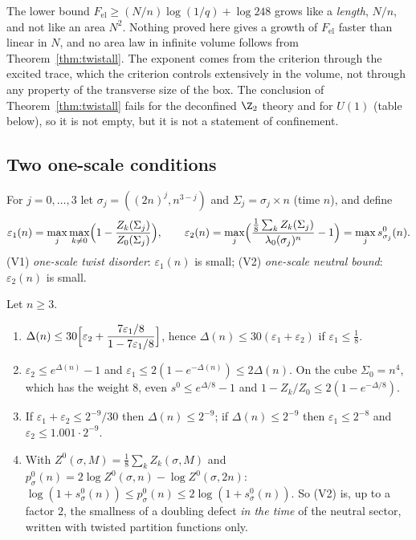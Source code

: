 \begin{remark}\label{rem:length}
The lower bound $F_{\mathrm{el}}\ge(N/n)\log(1/q)+\log248$ grows like a \emph{length}, $N/n$, and not like an area $N^2$. Nothing proved here gives a growth of $F_{\mathrm{el}}$ faster than linear in $N$, and no area law in infinite volume follows from Theorem~\ref{thm:twistall}. The exponent comes from the criterion through the excited trace, which the criterion controls extensively in the volume, not through any property of the transverse size of the box. The conclusion of Theorem~\ref{thm:twistall} fails for the deconfined $\Z_2$ theory and for $U(1)$ (table below), so it is not empty, but it is not a statement of confinement.
\end{remark}

\subsection{Two one-scale conditions}\label{subsec:T3}
For $j=0,\dots,3$ let $\sigma_j=((2n)^j,n^{3-j})$ and $\Sigma_j=\sigma_j\times n$ (time $n$), and define
\[
\varepsilon_1(n)=\max_j\max_{k\ne0}\Bigl(1-\frac{Z_k(\Sigma_j)}{Z_0(\Sigma_j)}\Bigr),\qquad
\varepsilon_2(n)=\max_j\Bigl(\frac{\frac18\sum_kZ_k(\Sigma_j)}{\lambda_0(\sigma_j)^n}-1\Bigr)=\max_js^0_{\sigma_j}(n).
\]
(V1) \emph{one-scale twist disorder}: $\varepsilon_1(n)$ is small; (V2) \emph{one-scale neutral bound}: $\varepsilon_2(n)$ is small.
\begin{theorem}\label{thm:twosub}
Let $n\ge3$.
\begin{enumerate}
\item[(a)] $\Delta(n)\le30\Bigl[\varepsilon_2+\dfrac{7\varepsilon_1/8}{1-7\varepsilon_1/8}\Bigr]$, hence $\Delta(n)\le30(\varepsilon_1+\varepsilon_2)$ if $\varepsilon_1\le\frac18$.
\item[(b)] $\varepsilon_2\le e^{\Delta(n)}-1$ and $\varepsilon_1\le2(1-e^{-\Delta(n)})\le2\Delta(n)$. On the cube $\Sigma_0=n^4$, which has the weight $8$, even $s^0\le e^{\Delta/8}-1$ and $1-Z_k/Z_0\le2(1-e^{-\Delta/8})$.
\item[(c)] If $\varepsilon_1+\varepsilon_2\le2^{-9}/30$ then $\Delta(n)\le2^{-9}$; if $\Delta(n)\le2^{-9}$ then $\varepsilon_1\le2^{-8}$ and $\varepsilon_2\le1.001\cdot2^{-9}$.
\item[(d)] With $Z^0(\sigma,M)=\frac18\sum_kZ_k(\sigma,M)$ and $p^0_\sigma(n)=2\log Z^0(\sigma,n)-\log Z^0(\sigma,2n)$: $\log(1+s^0_\sigma(n))\le p^0_\sigma(n)\le2\log(1+s^0_\sigma(n))$. So (V2) is, up to a factor $2$, the smallness of a doubling defect \emph{in the time} of the neutral sector, written with twisted partition functions only.
\end{enumerate}
\end{theorem}

